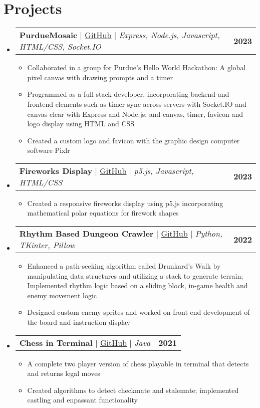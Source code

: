 \documentclass[letterpaper,11pt]{article}
\makeatletter
\newcommand{\resumeItem}[1]{
  \item\small{
    {#1 \vspace{-2pt}}
  }
}
\newcommand{\resumeProjectHeading}[2]{
    \item
    \begin{tabular*}{1.001\textwidth}{l@{\extracolsep{\fill}}r}
      \small#1 & \textbf{\small #2}\\
    \end{tabular*}\vspace{-7pt}
}
\newcommand{\resumeSubHeadingListStart}{\begin{itemize}[leftmargin=0.0in, label={}]}
\newcommand{\resumeSubHeadingListEnd}{\end{itemize}}
\newcommand{\resumeItemListStart}{\begin{itemize}}
\newcommand{\resumeItemListEnd}{\end{itemize}\vspace{-5pt}}
\makeatother
\begin{document}
\section{Projects}
    \vspace{-5pt}
    \resumeSubHeadingListStart
      \resumeProjectHeading
          {\textbf{PurdueMosaic} $|$ \href{https://github.com/inner-LMNt/PurdueMosaic}{\underline{GitHub}} $|$ \emph{Express, Node.js, Javascript, HTML/CSS, Socket.IO}}{2023}
          \resumeItemListStart
            \resumeItem{Collaborated in a group for Purdue's Hello World Hackathon: A global pixel canvas with drawing prompts and a timer}
            \resumeItem{Programmed as a full stack developer, incorporating backend and frontend elements such as timer sync across servers with Socket.IO and canvas clear with Express and Node.js; and canvas, timer, favicon and logo display using HTML and CSS}
            \resumeItem{Created a custom logo and favicon with the graphic design computer software Pixlr}
          \resumeItemListEnd
          \vspace{-13pt}
      \resumeProjectHeading
          {\textbf{Fireworks Display} $|$ \href{https://github.com/alex2tu/fireworks-display}{\underline{GitHub}} $|$ \emph{p5.js, Javascript, HTML/CSS}}{2023}
          \resumeItemListStart
            \resumeItem{Created a responsive fireworks display using p5.js incorporating mathematical polar equations for firework shapes}
          \resumeItemListEnd 
          \vspace{-13pt}
      \resumeProjectHeading
          {\textbf{Rhythm Based Dungeon Crawler} $|$ \href{https://github.com/alex2tu/crypt-of-necrodancer}{\underline{GitHub}} $|$ \emph{Python, TKinter, Pillow}}{2022}
          \resumeItemListStart
            \resumeItem{Enhanced a path-seeking algorithm called Drunkard's Walk by manipulating data structures and utilizing a stack to generate terrain; Implemented rhythm logic based on a sliding block, in-game health and enemy movement logic}
            \resumeItem{Designed custom enemy sprites and worked on front-end development of the board and instruction display}
          \resumeItemListEnd 
          \vspace{-13pt}
      \resumeProjectHeading
          {\textbf{Chess in Terminal} $|$ \href{https://github.com/alex2tu/chess-in-terminal}{\underline{GitHub}} $|$ \emph{Java}}{2021}
          \resumeItemListStart
            \resumeItem{A complete two player version of chess playable in terminal that detects and returns legal moves}
            \resumeItem{Created algorithms to detect checkmate and stalemate; implemented castling and enpassant functionality}
          \resumeItemListEnd 
    \resumeSubHeadingListEnd
\vspace{-15pt}
\end{document}
